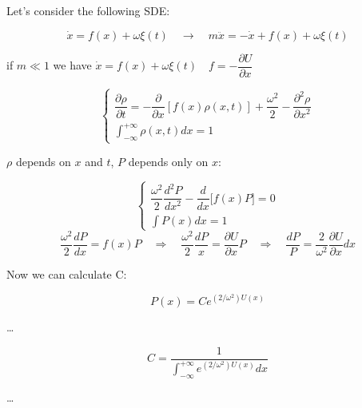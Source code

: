\begin{exampleblock}[]

Let's consider the following SDE:

$$
\dot x = f(x) + \omega \xi(t)
\quad \rightarrow \quad
m\ddot x = -\dot x + f(x) + \omega \xi(t)
$$

if $m \ll 1$ we have $ \dot x = f(x) + \omega \xi(t) \quad f = - \dfrac{\partial U}{\partial x}$

$$
\begin{cases}
\dfrac{\partial \rho}{\partial t} = - \dfrac{\partial}{\partial x} \left[ f(x) \rho(x,t) \right] + \dfrac{\omega^2}{2} - \dfrac{\partial^2 \rho}{\partial x^2}
\\
\int_{- \infty}^{+ \infty} \rho(x,t) dx = 1
\end{cases}
$$

$\rho$ depends on $x$ and $t$, $P$ depends only on $x$:

$$
\begin{cases}
    \dfrac{\omega^2}{2} \dfrac{d^2 P}{dx^2} - \dfrac{d}{dx} \big[ f(x) P \big] = 0
    \\
    \int P(x) dx = 1
\end{cases}
$$
$$
\dfrac{\omega^2}{2} \dfrac{dP}{dx} = f(x) P
\quad \Rightarrow \quad
\dfrac{\omega^2}{2} \dfrac{dP}{x} = \dfrac{\partial U}{\partial x} P
\quad \Rightarrow \quad
\dfrac{dP}{P} = \dfrac{2}{\omega^2} \dfrac{\partial U}{\partial x} dx
$$

Now we can calculate C:

$$
P(x) = C e^{({2}/{\omega^2}) U(x)}
$$

\dots

$$
C = \dfrac 1{\displaystyle\int_{- \infty}^{+ \infty} e^{({2}/{\omega^2}) U(x)} dx}
$$

\dots


\end{exampleblock}
